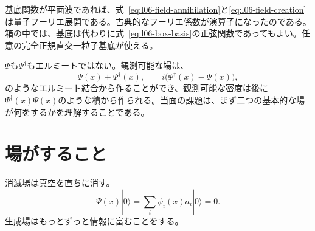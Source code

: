 基底関数が平面波であれば、式~\eqref{eq:l06-field-annihilation}と\eqref{eq:l06-field-creation}は量子フーリエ展開である。古典的なフーリエ係数が演算子になったのである。箱の中では、基底は代わりに式~\eqref{eq:l06-box-basis}の正弦関数であってもよい。任意の完全正規直交一粒子基底が使える。

\(\Psi\)も\(\Psi^\dagger\)もエルミートではない。観測可能な場は、
\begin{equation}
\Psi(x)+\Psi^\dagger(x),
\qquad
i\bigl(\Psi^\dagger(x)-\Psi(x)\bigr),
\end{equation}
のようなエルミート結合から作ることができ、観測可能な密度は後に\(\Psi^\dagger(x)\Psi(x)\)のような積から作られる。当面の課題は、まず二つの基本的な場が何をするかを理解することである。

\begin{classroomqa}
\end{classroomqa}

\section{場がすること}

消滅場は真空を直ちに消す。
\begin{equation}
\Psi(x)|0\rangle
=\sum_i\psi_i(x)a_i|0\rangle
=0.
\label{eq:l06-field-kills-vacuum}
\end{equation}
生成場はもっとずっと情報に富むことをする。

